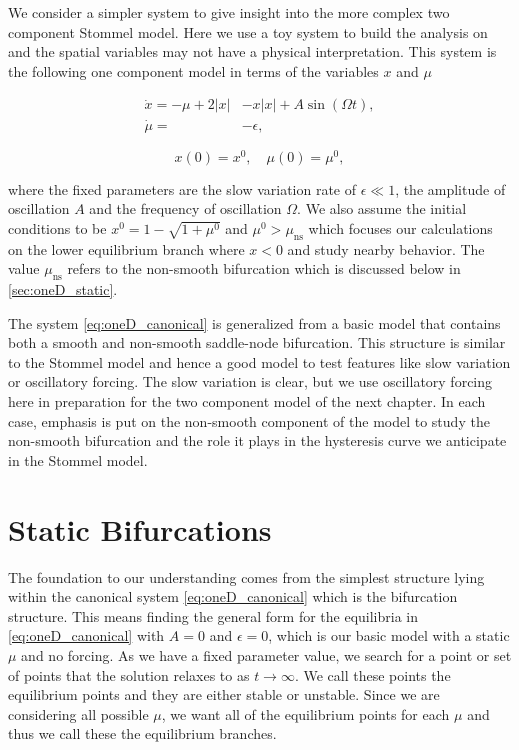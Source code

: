 We consider a simpler system to give insight into the more complex two component Stommel model. Here we use a toy system to build the analysis on and the spatial variables may not have a physical interpretation. This system is the following one component model in terms of the variables $x$ and $\mu$

\begin{equation}\label{eq:oneD_canonical}
\begin{aligned}
\dot{x}=-\mu+2|x|&-x|x|+A\sin(\Omega t),\\
\dot{\mu}=&-\epsilon,
\end{aligned}
\end{equation}

\begin{equation*}
x(0)=x^0,\quad\mu(0)=\mu^0,
\end{equation*}

where the fixed parameters are the slow variation rate of $\epsilon \ll 1$, the amplitude of oscillation $A$ and the frequency of oscillation $\Omega$. We also assume the initial conditions to be ${x^0=1-\sqrt{1+\mu^0}}$ and $\mu^0>\mu_{\text{ns}}$ which focuses our calculations on the lower equilibrium branch where $x<0$ and study nearby behavior. The value $\mu_{\text{ns}}$ refers to the non-smooth bifurcation which is discussed below in \autoref{sec:oneD_static}.

\indent The system \eqref{eq:oneD_canonical} is generalized from a basic model that contains both a smooth and non-smooth saddle-node bifurcation. This structure is similar to the Stommel model and hence a good model to test features like slow variation or oscillatory forcing. The slow variation is clear, but we use oscillatory forcing here in preparation for the two component model of the next chapter. In each case, emphasis is put on the non-smooth component of the model to study the non-smooth bifurcation and the role it plays in the hysteresis curve we anticipate in the Stommel model.

\section{Static Bifurcations}
\label{sec:oneD_static}

The foundation to our understanding comes from the simplest structure lying within the canonical system \eqref{eq:oneD_canonical} which is the bifurcation structure. This means finding the general form for the equilibria in \eqref{eq:oneD_canonical} with $A=0$ and $\epsilon=0$, which is our basic model with a static $\mu$ and no forcing. As we have a fixed parameter value, we search for a point or set of points that the solution relaxes to as $t\to \infty$. We call these points the equilibrium points and they are either stable or unstable. Since we are considering all possible $\mu$, we want all of the equilibrium points for each $\mu$ and thus we call these the equilibrium branches.

